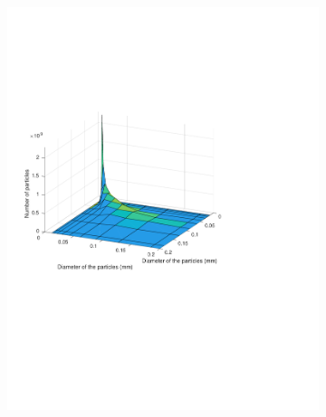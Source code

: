 \documentclass[preprint,11pt,authoryear]{elsarticle}
\begin{document}
\begin{figure}
\begin{subfigure}{.5\textwidth}
\includegraphics[scale=0.6]{rslts-PBM_50s_psd.pdf}
\caption{}
\label{fig:50s}
\end{subfigure}
\begin{subfigure}{.5\textwidth}


\end{subfigure}
\end{figure}
\end{document}
